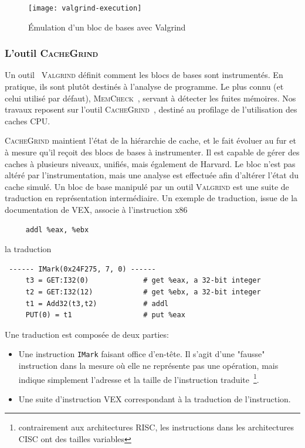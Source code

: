 \begin{figure}[H]
	\centering
	\texttt{[image: valgrind-execution]}
	\caption{\label{fig:valgrind_exec} Émulation d'un bloc de bases avec Valgrind}
\end{figure}

\subsubsection{L'outil \textsc{CacheGrind}}

Un outil ~\textsc{Valgrind} définit comment les blocs de bases sont instrumentés. 
En pratique, ils sont plutôt destinés à l'analyse de programme. 
Le plus connu (et celui utilisé par défaut), \textsc{MemCheck}~\cite{valgindmemcheck}, servant à détecter les fuites mémoires.
Nos travaux reposent sur l'outil \textsc{CacheGrind}~\cite{valgindcachegrind}, destiné au profilage de l'utilisation des caches CPU.

\textsc{CacheGrind} maintient l'état de la hiérarchie de cache, et le fait évoluer au fur et à mesure qu'il reçoit des blocs de bases à instrumenter.
Il est capable de gérer des caches à plusieurs niveaux, unifiés, mais également de Harvard.
Le bloc n'est pas altéré par l'instrumentation, mais une analyse est effectuée afin d'altérer l'état du cache simulé.
Un bloc de base manipulé par un outil \textsc{Valgrind} est une suite de traduction en représentation intermédiaire.
Un exemple de traduction, issue de la documentation de \textsc{VEX}, associe à l'instruction x86

\begin{lstlisting}
     addl %eax, %ebx
\end{lstlisting}

la traduction

\begin{lstlisting}
 ------ IMark(0x24F275, 7, 0) ------
     t3 = GET:I32(0)             # get %eax, a 32-bit integer
     t2 = GET:I32(12)            # get %ebx, a 32-bit integer
     t1 = Add32(t3,t2)           # addl
     PUT(0) = t1                 # put %eax
\end{lstlisting}

Une traduction est composée de deux parties:
\begin{itemize}
	\item Une instruction \texttt{IMark} faisant office d'en-tête. 
	Il s'agit d'une "fausse" instruction dans la mesure où elle ne représente pas une opération, mais indique simplement l'adresse et la taille de l'instruction traduite~\footnote{contrairement aux architectures RISC, les instructions dans les architectures CISC ont des tailles variables}.
	
	\item Une suite d'instruction \textsc{VEX} correspondant à la traduction de l'instruction.
\end{itemize}

